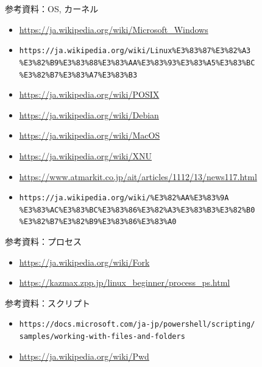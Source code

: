 \documentclass[12pt,aspectratio=169]{beamer}
\begin{document}
\begin{frame}{参考資料：OS, カーネル}
  \begin{itemize}
    \item \url { https://ja.wikipedia.org/wiki/Microsoft_Windows }
    \item \texttt {https://ja.wikipedia.org/wiki/Linux\%E3\%83\%87\%E3\%82\%A3 \\ \%E3\%82\%B9\%E3\%83\%88\%E3\%83\%AA\%E3\%83\%93\%E3\%83\%A5\%E3\%83\%BC \\ \%E3\%82\%B7\%E3\%83\%A7\%E3\%83\%B3 }
    \item \url { https://ja.wikipedia.org/wiki/POSIX }
    \item \url { https://ja.wikipedia.org/wiki/Debian }
    \item \url { https://ja.wikipedia.org/wiki/MacOS }
    \item \url { https://ja.wikipedia.org/wiki/XNU }
    \item \url { https://www.atmarkit.co.jp/ait/articles/1112/13/news117.html }
    \item \texttt {https://ja.wikipedia.org/wiki/\%E3\%82\%AA\%E3\%83\%9A \\ \%E3\%83\%AC\%E3\%83\%BC\%E3\%83\%86\%E3\%82\%A3\%E3\%83\%B3\%E3\%82\%B0 \\ \%E3\%82\%B7\%E3\%82\%B9\%E3\%83\%86\%E3\%83\%A0 }
  \end{itemize}

\end{frame}


\begin{frame}{参考資料：プロセス}
  \begin{itemize}
    \item \url { https://ja.wikipedia.org/wiki/Fork }
    \item \url { https://kazmax.zpp.jp/linux_beginner/process_ps.html }
  \end{itemize}

\end{frame}


\begin{frame}{参考資料：スクリプト}
  \begin{itemize}
    \item \texttt {https://docs.microsoft.com/ja-jp/powershell/scripting/\\ samples/working-with-files-and-folders }
    \item \url { https://ja.wikipedia.org/wiki/Pwd }
  \end{itemize}

\end{frame}
\end{document}

